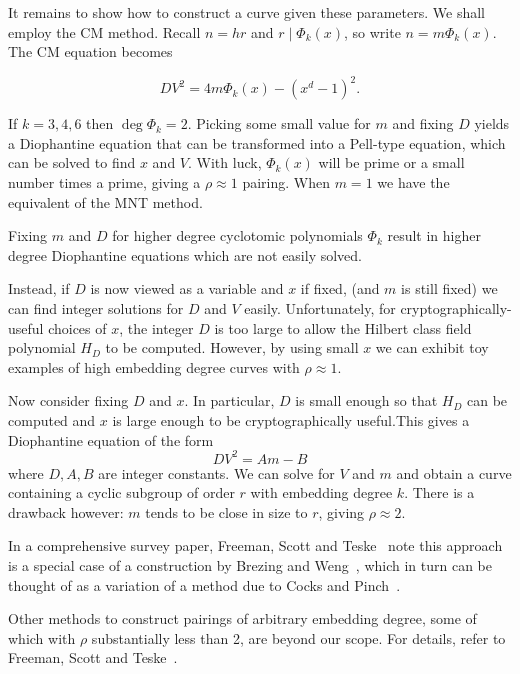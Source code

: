 It remains to show how to construct a curve given these parameters. We shall
employ the CM method. Recall $n = hr$ and $r \mid \Phi_k(x)$, so write
$n = m \Phi_k(x)$. The CM equation becomes

\[ D V^2 = 4m\Phi_k(x)-(x^d-1)^2 . \]

If $k=3,4,6$ then $\deg \Phi_k = 2$. Picking some small value for $m$
and fixing $D$ yields
a Diophantine equation that can be transformed into a Pell-type equation,
which can be solved to find $x$ and $V$. With luck, $\Phi_k(x)$ will be
prime or a small number times a prime, giving a $\rho \approx 1$ pairing.
When $m=1$ we have the equivalent of the MNT method.

Fixing $m$ and $D$ for higher degree cyclotomic polynomials
$\Phi_k$ result in higher degree Diophantine equations which are not easily
solved.

Instead, if $D$ is now viewed as a variable and $x$ if fixed,
(and $m$ is still fixed) we can find integer solutions for $D$ and $V$
easily. Unfortunately, for cryptographically-useful choices of $x$,
the integer $D$ is too large to allow the Hilbert class field polynomial $H_D$
to be computed.
However, by using small $x$ we can exhibit toy examples of high
embedding degree curves with $\rho \approx 1$.

Now consider fixing $D$ and $x$. In particular, $D$ is small enough so
that $H_D$ can be computed and $x$ is large enough to be cryptographically
useful.This gives a Diophantine
equation of the form
\[ D V^2 = Am - B \]
where $D, A, B$ are integer constants. We can solve for $V$ and $m$ and
obtain a curve containing a cyclic subgroup of order $r$
with embedding degree $k$. There is a drawback however: $m$ tends to be close
in size to $r$, giving $\rho \approx 2$.

In a comprehensive survey paper,
Freeman, Scott and Teske~\cite{fst} note this approach is a special case of a
construction by Brezing and Weng~\cite{bw}, which in turn can be thought of as a
variation of a method due to Cocks and Pinch~\cite{cp}.

Other methods to construct pairings of arbitrary embedding degree,
some of which with $\rho$ substantially less than 2, are beyond our scope.
For details, refer to Freeman, Scott and Teske~\cite{fst}.

